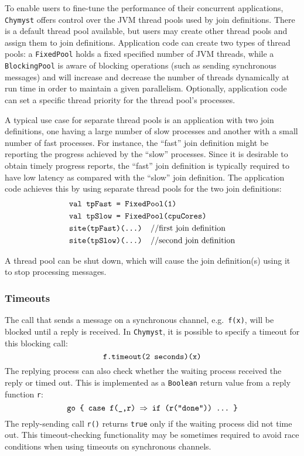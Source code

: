 \documentclass[sigplan,10pt,review,anonymous]{acmart}\settopmatter{printfolios=true}
\begin{document}
To enable users to fine-tune the performance of their concurrent applications,
\texttt{Chymyst} offers control over the JVM thread pools used by
join definitions. There is a default thread pool available, but users
may create other thread pools and assign them to join definitions.
Application code can create two types of thread pools: a \texttt{FixedPool}
holds a fixed specified number of JVM threads, while a \texttt{BlockingPool}
is aware of blocking operations (such as sending synchronous messages)
and will increase and decrease the number of threads dynamically at
run time in order to maintain a given parallelism. Optionally, application
code can set a specific thread priority for the thread pool's processes.

A typical use case for separate thread pools is an application with
two join definitions, one having a large number of slow processes
and another with a small number of fast processes. For instance, the
``fast'' join definition might be reporting the progress achieved
by the ``slow'' processes. Since it is desirable to obtain timely
progress reports, the ``fast'' join definition is typically required
to have low latency as compared with the ``slow'' join definition.
The application code achieves this by using separate thread pools
for the two join definitions:
\begin{align*}
 & \text{\texttt{val tpFast = FixedPool(1)}}\\
 & \text{\texttt{val tpSlow = FixedPool(cpuCores)}}\\
 & \text{\texttt{site(tpFast)(...) \textnormal{//first join definition}}}\\
 & \text{\texttt{site(tpSlow)(...) \textnormal{//second join definition}}}
\end{align*}

A thread pool can be shut down, which will cause the join definition(s)
using it to stop processing messages.

\subsubsection{Timeouts}

The call that sends a message on a synchronous channel,
e.g.~\texttt{f(x)}, will be blocked until a reply is received. In
\texttt{Chymyst}, it is possible to specify a timeout for this blocking
call: 
\[
\text{\texttt{f.timeout(2 seconds)(x)}}
\]
The replying process can also check whether the waiting
process received the reply or timed out. This is implemented
as a \texttt{Boolean} return value from a reply function \texttt{r}:
\[
\text{\texttt{go \{ case f(\_,r) \ensuremath{\Rightarrow} if (r("done")) ...~\}}}
\]
The reply-sending call \texttt{r()} returns \texttt{true} only if
the waiting process did not time out. This timeout-checking functionality
may be sometimes required to avoid race conditions when using timeouts
on synchronous channels.
\end{document}
